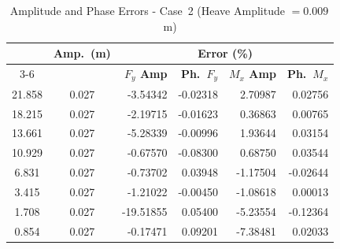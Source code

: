 \documentclass[../main]{subfiles}
\begin{document}
\FloatBarrier

\begin{table}[htbp]
\centering
\caption{Amplitude and Phase Errors - Case~2 (Heave Amplitude $= 0.009$\,m)}
\label{tab:err_case2}
\renewcommand{\arraystretch}{1.25}
\begin{tabular}{|c|c|r|r|r|r|}
\hline
\rule{0pt}{12pt}
\multirow{2}{*}{\textbf{$U_r$}} &
\multirow{2}{*}{\textbf{Amp.\ (m)}} &
\multicolumn{4}{c|}{\textbf{Error (\%)}} \\[2pt]
\cline{3-6}
\rule{0pt}{10pt} & &
\textbf{$F_y$ Amp} &
\textbf{Ph.\ $F_y$} &
\textbf{$M_x$ Amp} &
\textbf{Ph.\ $M_x$} \\[4pt]
\hline
21.858 & 0.027 &  -3.54342 & -0.02318 &  2.70987 &  0.02756 \\
18.215 & 0.027 &  -2.19715 & -0.01623 &  0.36863 &  0.00765 \\
13.661 & 0.027 &  -5.28339 & -0.00996 &  1.93644 &  0.03154 \\
10.929 & 0.027 &  -0.67570 & -0.08300 &  0.68750 &  0.03544 \\
 6.831 & 0.027 &  -0.73702 &  0.03948 & -1.17504 & -0.02644 \\
 3.415 & 0.027 &  -1.21022 & -0.00450 & -1.08618 &  0.00013 \\
 1.708 & 0.027 & -19.51855 &  0.05400 & -5.23554 & -0.12364 \\
 0.854 & 0.027 &  -0.17471 &  0.09201 & -7.38481 &  0.02033 \\
\hline
\end{tabular}
\end{table}

\FloatBarrier
\end{document}
